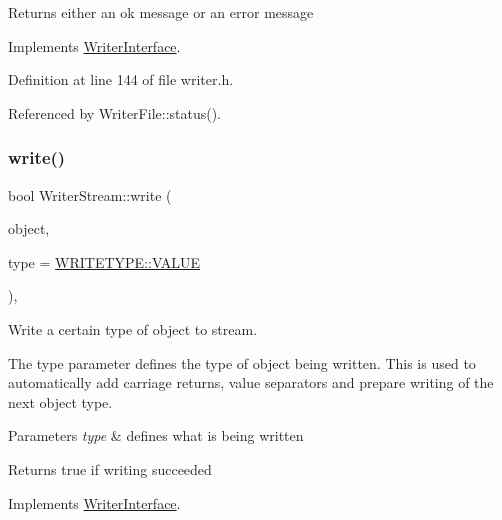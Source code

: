 \begin{DoxyReturn}{Returns}
either an ok message or an error message 
\end{DoxyReturn}


Implements \hyperlink{classWriterInterface_a8865a526bb8c67ff4c96f25fc8217c81}{Writer\+Interface}.



Definition at line 144 of file writer.\+h.



Referenced by Writer\+File\+::status().

\mbox{\label{classWriterStream_aae19a7c01c19fe723a7a3223a53550c0}} 
\subsubsection{\texorpdfstring{write()}{write()}}
{\footnotesize\ttfamily bool Writer\+Stream\+::write (\begin{DoxyParamCaption}\item[{const std\+::string \&}]{object,  }\item[{const \hyperlink{classWriterInterface_af35706b761b016972144a9333637d93d}{W\+R\+I\+T\+E\+T\+Y\+PE} \&}]{type = {\ttfamily \hyperlink{classWriterInterface_af35706b761b016972144a9333637d93daecc2e9c313faddb07e7da223c1dc5c3f}{W\+R\+I\+T\+E\+T\+Y\+P\+E\+::\+V\+A\+L\+UE}} }\end{DoxyParamCaption})\hspace{0.3cm}{\ttfamily [inline]}, {\ttfamily [virtual]}}



Write a certain type of object to stream. 

The type parameter defines the type of object being written. This is used to automatically add carriage returns, value separators and prepare writing of the next object type.


\begin{DoxyParams}{Parameters}
{\em type} & defines what is being written \\
\hline
\end{DoxyParams}
\begin{DoxyReturn}{Returns}
true if writing succeeded 
\end{DoxyReturn}


Implements \hyperlink{classWriterInterface_a2f756ac0b3299f4dbadececad4055424}{Writer\+Interface}.



